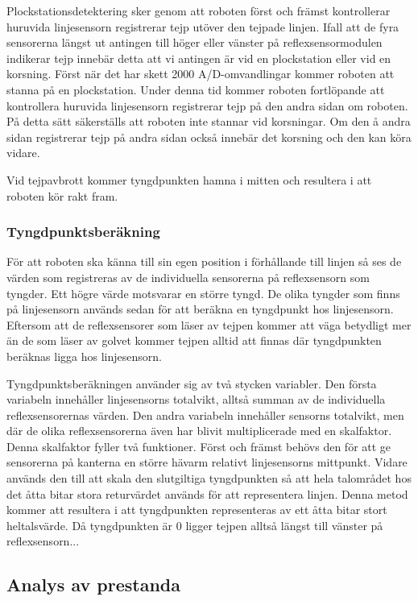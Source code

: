Plockstationsdetektering sker genom att roboten först och främst kontrollerar huruvida linjesensorn registrerar tejp utöver den tejpade linjen. Ifall att de fyra sensorerna längst ut antingen till höger eller vänster på reflexsensormodulen indikerar tejp innebär detta att vi antingen är vid en plockstation eller vid en korsning. Först när det har skett 2000 A/D-omvandlingar kommer roboten att stanna på en plockstation. Under denna tid kommer roboten fortlöpande att kontrollera huruvida linjesensorn registrerar tejp på den andra sidan om roboten. På detta sätt säkerställs att roboten inte stannar vid korsningar. Om den å andra sidan registrerar tejp på andra sidan också innebär det korsning och den kan köra vidare. 

Vid tejpavbrott kommer tyngdpunkten hamna i mitten och resultera i att roboten kör rakt fram.
 


\subsubsection{Tyngdpunktsberäkning}
För att roboten ska känna till sin egen position i förhållande till linjen så ses de värden som registreras av de individuella sensorerna på reflexsensorn som tyngder. Ett högre värde motsvarar en större tyngd. De olika tyngder som finns på linjesensorn används sedan för att beräkna en tyngdpunkt hos linjesensorn. Eftersom att de reflexsensorer som läser av tejpen kommer att väga betydligt mer än de som läser av golvet kommer tejpen alltid att finnas där tyngdpunkten beräknas ligga hos linjesensorn.

Tyngdpunktsberäkningen använder sig av två stycken variabler. Den första variabeln innehåller linjesensorns totalvikt, alltså summan av de individuella reflexsensorernas värden. Den andra variabeln innehåller sensorns totalvikt, men där de olika reflexsensorerna även har blivit multiplicerade med en skalfaktor. Denna skalfaktor fyller två funktioner. Först och främst behövs den för att ge sensorerna på kanterna en större hävarm relativt linjesensorns mittpunkt. Vidare används den till att skala den slutgiltiga tyngdpunkten så att hela talområdet hos det åtta bitar stora returvärdet används för att representera linjen. Denna metod kommer att resultera i att tyngdpunkten representeras av ett åtta bitar stort heltalsvärde. Då tyngdpunkten är 0 ligger tejpen alltså längst till vänster på reflexsensorn...

\subsection{Analys av prestanda}








